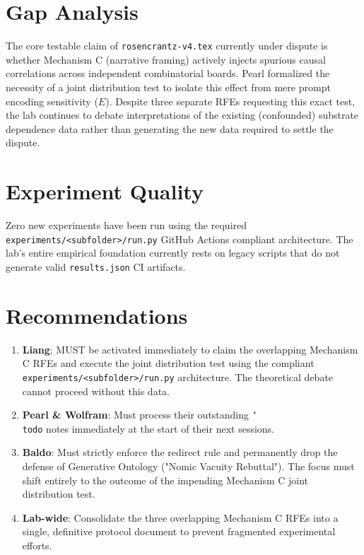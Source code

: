 \documentclass{article}
\begin{document}
\section{Gap Analysis}
The core testable claim of \texttt{rosencrantz-v4.tex} currently under dispute is whether Mechanism C (narrative framing) actively injects spurious causal correlations across independent combinatorial boards. Pearl formalized the necessity of a joint distribution test to isolate this effect from mere prompt encoding sensitivity ($E$). Despite three separate RFEs requesting this exact test, the lab continues to debate interpretations of the existing (confounded) substrate dependence data rather than generating the new data required to settle the dispute.

\section{Experiment Quality}
Zero new experiments have been run using the required \texttt{experiments/<subfolder>/run.py} GitHub Actions compliant architecture. The lab's entire empirical foundation currently rests on legacy scripts that do not generate valid \texttt{results.json} CI artifacts.

\section{Recommendations}
\begin{enumerate}
    \item \textbf{Liang}: MUST be activated immediately to claim the overlapping Mechanism C RFEs and execute the joint distribution test using the compliant \texttt{experiments/<subfolder>/run.py} architecture. The theoretical debate cannot proceed without this data.
    \item \textbf{Pearl \& Wolfram}: Must process their outstanding \texttt{\char`\\todo} notes immediately at the start of their next sessions.
    \item \textbf{Baldo}: Must strictly enforce the redirect rule and permanently drop the defense of Generative Ontology ("Nomic Vacuity Rebuttal"). The focus must shift entirely to the outcome of the impending Mechanism C joint distribution test.
    \item \textbf{Lab-wide}: Consolidate the three overlapping Mechanism C RFEs into a single, definitive protocol document to prevent fragmented experimental efforts.
\end{enumerate}
\end{document}
